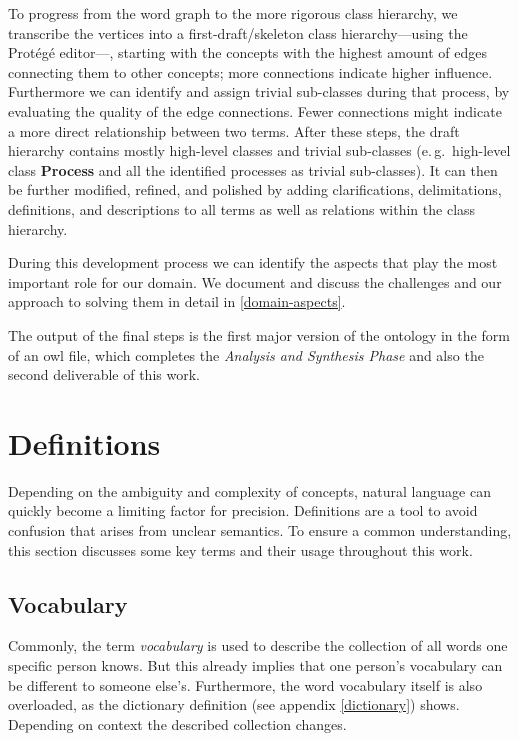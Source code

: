 \documentclass[a4paper, DIV=13, BCOR=0cm]{scrbook}
\newcommand{\eg}{e.\,g.\ }
\begin{document}
To progress from the word graph to the more rigorous class hierarchy, we transcribe the vertices into a first-draft/skeleton class hierarchy---using the Protégé editor---, starting with the concepts with the highest amount of edges connecting them to other concepts; more connections indicate higher influence. Furthermore we can identify and assign trivial sub-classes during that process, by evaluating the quality of the edge connections. Fewer connections might indicate a more direct relationship between two terms. After these steps, the draft hierarchy contains mostly high-level classes and trivial sub-classes (\eg high-level class \textbf{Process} and all the identified processes as trivial sub-classes). It can then be further modified, refined, and polished by adding clarifications, delimitations, definitions, and descriptions to all terms as well as relations within the class hierarchy.

During this development process we can identify the aspects that play the most important role for our domain. We document and discuss the challenges and our approach to solving them in detail in \autoref{domain-aspects}.

The output of the final steps is the first major version of the ontology in the form of an \gls{owl} file, which completes the \textit{Analysis and Synthesis Phase} and also the second deliverable of this work.

\section{Definitions }
\label{definitions}
Depending on the ambiguity and complexity of concepts, natural language can quickly become a limiting factor for precision. Definitions are a tool to avoid confusion that arises from unclear semantics. To ensure a common understanding, this section discusses some key terms and their usage throughout this work.

\subsection{Vocabulary}
\label{vocabulary}
Commonly, the term \textit{vocabulary} is used to describe the collection of all words one specific person knows. But this already implies that one person's vocabulary can be different to someone else's. Furthermore, the word vocabulary itself is also overloaded, as the dictionary definition (see appendix \ref{dictionary}) shows. Depending on context the described collection changes. \cite{mw-dictionary}
\end{document}
